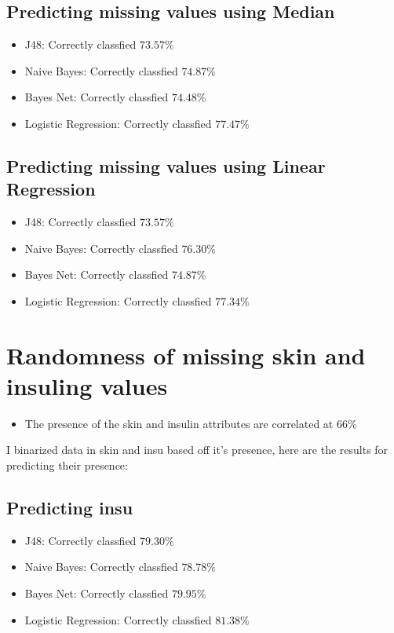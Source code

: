 \documentclass{article}
\begin{document}
\subsection{\small{Predicting missing values using Median }}
\begin{itemize}
\item J48: Correctly classfied $73.57 \%$
\item Naive Bayes: Correctly classfied $74.87 \%$
\item Bayes Net: Correctly classfied $74.48 \%$
\item Logistic Regression: Correctly classfied $77.47 \%$
\end{itemize}

\subsection{\small{Predicting missing values using Linear Regression }}
\begin{itemize}
\item J48: Correctly classfied $73.57 \%$
\item Naive Bayes: Correctly classfied $76.30 \%$
\item Bayes Net: Correctly classfied $74.87 \%$
\item Logistic Regression: Correctly classfied $77.34 \%$
\end{itemize}

\section{\small{Randomness of missing skin and insuling values}}
\begin{itemize}
\item The presence of the skin and insulin attributes are correlated at $66\%$
\end{itemize}
I binarized data in skin and insu based off it's presence, here are the results for predicting their presence:

\subsection{\small{Predicting insu }}
\begin{itemize}
\item J48: Correctly classfied $79.30 \%$
\item Naive Bayes: Correctly classfied $78.78 \%$
\item Bayes Net: Correctly classfied $79.95 \%$
\item Logistic Regression: Correctly classfied $81.38 \%$
\end{itemize}
\end{document}
